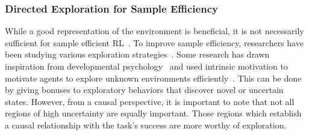 \documentclass[10pt]{article} %
\theoremstyle{definition}
\begin{document}
\subsubsection{Directed Exploration for Sample Efficiency} 
While a good representation of the environment is beneficial, it is not necessarily sufficient for sample efficient RL~\citep{duGoodRepresentationSufficient2020}. 
To improve sample efficiency, researchers have been studying various exploration strategies~\citep{yangExplorationDeepReinforcement2022}. Some research has drawn inspiration from developmental psychology~\citep{ryanIntrinsicExtrinsicMotivations2000, bartoIntrinsicMotivationReinforcement2013} and used intrinsic motivation to motivate agents to explore unknown environments efficiently~\citep{pathakCuriositydrivenExplorationSelfsupervised2017a, burdaExplorationRandomNetwork2022}. 
This can be done by giving bonuses to exploratory behaviors that discover novel or uncertain states. However, from a causal perspective, it is important to note that not all regions of high uncertainty are equally important. Those regions which establish a causal relationship with the task's success are more worthy of exploration.
\end{document}

